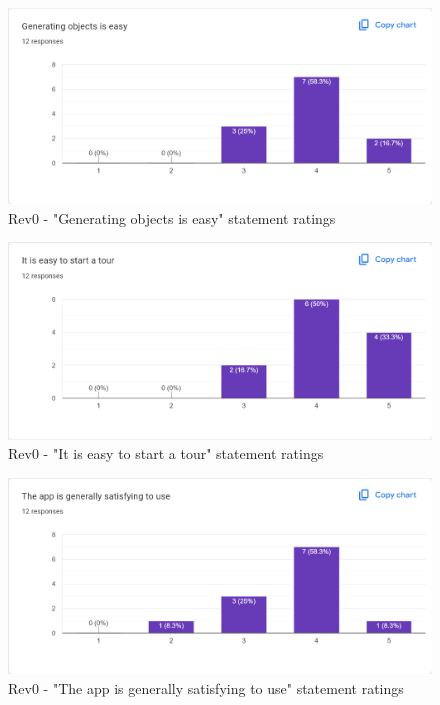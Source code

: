\documentclass{article}
\begin{document}
\begin{figure}[H]
  \caption{Rev0 - "Generating objects is easy" statement ratings}
  \centerline{\includegraphics[scale=0.35]{./Survey_Images/Rev0/Q3.png}}
  \label{fig:Detached}
\end{figure}

\begin{figure}[H]
  \caption{Rev0 - "It is easy to start a tour" statement ratings}
  \centerline{\includegraphics[scale=0.35]{./Survey_Images/Rev0/Q4.png}}
  \label{fig:RealWorld}
\end{figure}

\begin{figure}[H]
  \caption{Rev0 - "The app is generally satisfying to use" statement ratings}
  \centerline{\includegraphics[scale=0.35]{./Survey_Images/Rev0/Q5.png}}
  \label{fig:Social}
\end{figure}
\end{document}

